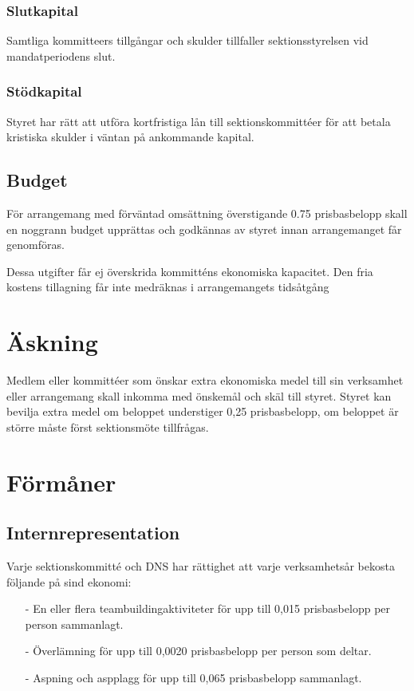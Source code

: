 \documentclass[a4paper, 10pt]{article}
\begin{document}
\subsubsection{Slutkapital}
Samtliga kommitteers tillgångar och skulder tillfaller sektionsstyrelsen vid mandatperiodens slut.
\subsubsection{Stödkapital}
Styret har rätt att utföra kortfristiga lån till sektionskommittéer för att betala kristiska skulder i väntan på ankommande kapital.
\subsection{Budget}
För arrangemang med förväntad omsättning överstigande 0.75 prisbasbelopp skall en noggrann budget upprättas och godkännas av styret innan arrangemanget får genomföras.

Dessa utgifter får ej överskrida kommitténs ekonomiska kapacitet. Den fria kostens tillagning får inte medräknas i arrangemangets tidsåtgång

\section{Äskning}
Medlem eller kommittéer som önskar extra ekonomiska medel till sin verksamhet eller arrangemang skall inkomma med önskemål och skäl till styret. Styret kan bevilja extra medel om beloppet understiger 0,25 prisbasbelopp, om beloppet är större måste först sektionsmöte tillfrågas.

\section{Förmåner}

\subsection{Internrepresentation}
\label{sec:internreps}
Varje sektionskommitté och DNS har rättighet att varje verksamhetsår bekosta följande på sind ekonomi:
\begin{itemize}
    \item[-] En eller flera teambuildingaktiviteter för upp till 0,015 prisbasbelopp per person sammanlagt.
    \item[-] Överlämning för upp till 0,0020 prisbasbelopp per person som deltar.
    \item[-] Aspning och aspplagg för upp till 0,065 prisbasbelopp sammanlagt.
\end{itemize}
\end{document}
